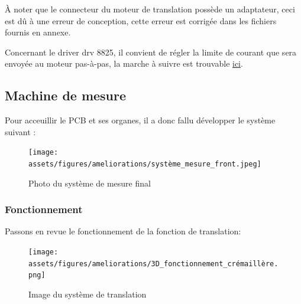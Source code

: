 À noter que le connecteur du moteur de translation possède un adaptateur, ceci est dû à une erreur de conception, cette erreur est corrigée
dans les fichiers fournis en annexe.

Concernant le driver drv 8825, il convient de régler la limite de courant que sera envoyée au moteur pas-à-pas, la marche à suivre est trouvable \href{https://www.pololu.com/product/2133}{ici}.\footnotemark



\subsection{Machine de mesure}
Pour acceuillir le PCB et ses organes, il a donc fallu développer le système suivant :
\begin{figure}[H]
    \centering
    \texttt{[image: assets/figures/ameliorations/système\_mesure\_front.jpeg]}
    \caption{Photo du système de mesure final}
\end{figure}

\newpage

\subsubsection{Fonctionnement}
Passons en revue le fonctionnement de la fonction de translation:
\begin{figure}[H]
    \centering
    \texttt{[image: assets/figures/ameliorations/3D\_fonctionnement\_crémaillère.png]}
    \caption{Image du système de translation}
\end{figure}


\newpage
